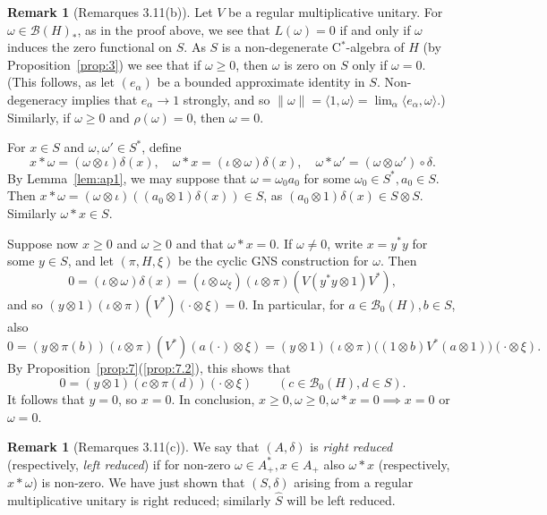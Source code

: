 \documentclass[a4paper,12pt]{article}
\theoremstyle{plain}
\theoremstyle{definition}
\newtheorem{remark}[proposition]{Remark}
\newcommand{\ip}[2]{{\langle {#1} , {#2} \rangle}}
\newcommand{\mc}{\mathcal}
\begin{document}
\begin{remark}[Remarques 3.11(b)]
Let $V$ be a regular multiplicative unitary.  For $\omega\in\mc B(H)_*$,
as in the proof above, we see that $L(\omega)=0$ if and only if $\omega$
induces the zero functional on $S$.  As $S$ is a non-degenerate C$^*$-algebra
of $H$ (by Proposition~\ref{prop:3}) we see that if $\omega\geq0$, then
$\omega$ is zero on $S$ only if $\omega=0$.  (This follows, as let
$(e_\alpha)$ be a bounded approximate identity in $S$.  Non-degeneracy
implies that $e_\alpha\rightarrow 1$ strongly, and so $\|\omega\|
= \ip{1}{\omega} = \lim_\alpha \ip{e_\alpha}{\omega}$.)
Similarly, if $\omega\geq0$ and $\rho(\omega)=0$, then $\omega=0$.

For $x\in S$ and $\omega,\omega'\in S^*$, define
\[ x*\omega = (\omega\otimes\iota)\delta(x), \quad
\omega*x = (\iota\otimes\omega)\delta(x), \quad
\omega*\omega' = (\omega\otimes\omega')\circ\delta. \]
By Lemma~\ref{lem:ap1}, we may suppose that $\omega=\omega_0a_0$ for some
$\omega_0\in S^*,a_0\in S$.  Then $x*\omega
= (\omega\otimes\iota)((a_0\otimes 1)\delta(x)) \in S$, as
$(a_0\otimes 1)\delta(x) \in S\otimes S$.  Similarly $\omega*x\in S$.

Suppose now $x\geq0$ and $\omega\geq0$ and that $\omega*x=0$.  If
$\omega\not=0$, write $x=y^*y$ for some $y\in S$, and let $(\pi,H,\xi)$ be the
cyclic GNS construction for $\omega$.  Then
\[ 0 = (\iota\otimes\omega)\delta(x)
= (\iota\otimes\omega_\xi)(\iota\otimes\pi)(V(y^*y\otimes 1)V^*), \]
and so $(y\otimes 1)(\iota\otimes\pi)(V^*)(\cdot\otimes\xi)=0$.
In particular, for $a\in\mc B_0(H), b\in S$, also
\[ 0 = (y\otimes\pi(b))(\iota\otimes\pi)(V^*)(a(\cdot)\otimes\xi)
= (y\otimes 1)(\iota\otimes\pi)\big( (1\otimes b)V^*(a\otimes 1) \big)
(\cdot\otimes\xi). \]
By Proposition~\ref{prop:7}(\ref{prop:7.2}), this shows that
\[ 0 = (y\otimes 1) (c\otimes\pi(d)) (\cdot\otimes\xi)
\qquad (c\in\mc B_0(H), d\in S). \]
It follows that $y=0$, so $x=0$.  In conclusion,
$x\geq0,\omega\geq0,\omega*x=0 \implies x=0$ or $\omega=0$.
\end{remark}

\begin{remark}[Remarques 3.11(c)]
We say that $(A,\delta)$ is \emph{right reduced} (respectively, \emph{left
reduced}) if for non-zero $\omega\in A^*_+, x\in A_+$ also $\omega*x$
(respectively, $x*\omega$) is non-zero.  We have just shown that $(S,\delta)$
arising from a regular multiplicative unitary is right reduced;
similarly $\hat S$ will be left reduced.
\end{remark}
\end{document}

